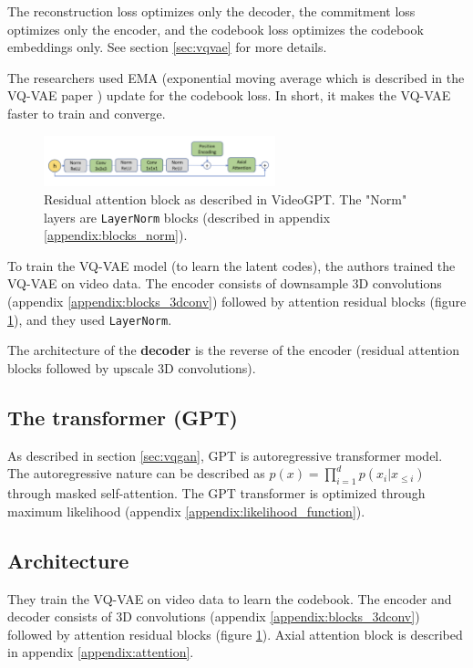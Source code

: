 The reconstruction loss optimizes only the decoder, the commitment loss optimizes only the encoder, and the codebook loss optimizes the codebook embeddings only. See section \ref{sec:vqvae} for more details.

The researchers used EMA (exponential moving average which is described in the VQ-VAE paper \cite{vqvae}) update for the codebook loss. In short, it makes the VQ-VAE faster to train and converge.

\begin{figure}
    \centering
    \includegraphics[width=0.6\textwidth]{images/video_synthesis/videogpt_res_atten_block.png}
    \caption{Residual attention block as described in VideoGPT. The "Norm" layers are \texttt{LayerNorm} blocks (described in appendix \ref{appendix:blocks_norm}).}
    \label{fig:videogpt_res_atten_block}
\end{figure}

To train the VQ-VAE model (to learn the latent codes), the authors trained the VQ-VAE on video data. The encoder consists of downsample 3D convolutions (appendix \ref{appendix:blocks_3dconv}) followed by attention residual blocks (figure \ref{fig:videogpt_res_atten_block}), and they used \texttt{LayerNorm}.

The architecture of the \textbf{decoder} is the reverse of the encoder (residual attention blocks followed by upscale 3D convolutions).

\subsection*{The transformer (GPT)}

As described in section \ref{sec:vqgan}, GPT is autoregressive transformer model. The autoregressive nature can be described as $p(x) = \prod_{i=1}^{d} p(x_i | x_{\leq i})$ through masked self-attention. The GPT transformer is optimized through maximum likelihood (appendix \ref{appendix:likelihood_function}). 






\subsection{Architecture}

They train the VQ-VAE on video data to learn the codebook. The encoder and decoder consists of 3D convolutions (appendix \ref{appendix:blocks_3dconv}) followed by attention residual blocks (figure \ref{fig:videogpt_res_atten_block}). Axial attention block is described in appendix \ref{appendix:attention}.